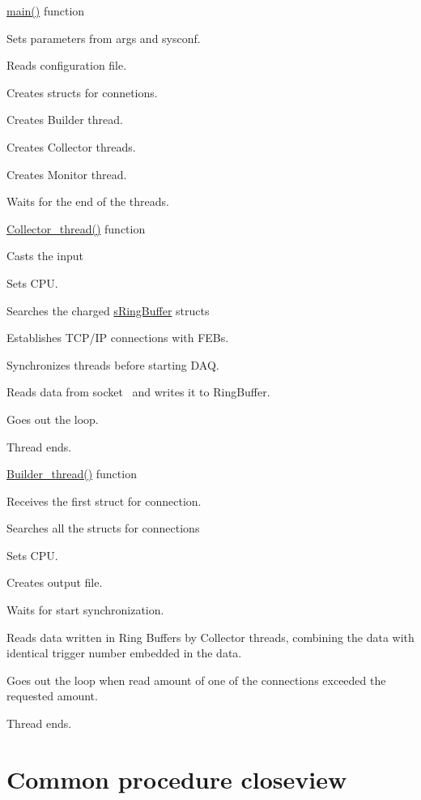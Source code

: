 \begin{DoxyItemize}
\item \hyperlink{Master_8cpp_a3c04138a5bfe5d72780bb7e82a18e627}{main()} function
\begin{DoxyItemize}
\item Sets parameters from args and sysconf.
\item Reads configuration file.
\item Creates structs for connetions.
\item Creates Builder thread.
\item Creates Collector threads.
\item Creates Monitor thread.
\item Waits for the end of the threads.
\end{DoxyItemize}
\item \hyperlink{Master_8cpp_a568c34b708bcc89579bda6142733110a}{Collector\+\_\+thread()} function
\begin{DoxyItemize}
\item Casts the input
\item Sets C\+PU.
\item Searches the charged \hyperlink{structsRingBuffer}{s\+Ring\+Buffer} structs
\item Establishes T\+C\+P/\+IP connections with F\+E\+Bs.
\item Synchronizes threads before starting D\+AQ.
\item Reads data from socket~\newline
 and writes it to Ring\+Buffer.
\item Goes out the loop.
\item Thread ends.
\end{DoxyItemize}
\item \hyperlink{Master_8cpp_a435b26afa480ba18cbef3620d0eccee2}{Builder\+\_\+thread()} function
\begin{DoxyItemize}
\item Receives the first struct for connection.
\item Searches all the structs for connections
\item Sets C\+PU.
\item Creates output file.
\item Waits for start synchronization.
\item Reads data written in Ring Buffers by Collector threads, combining the data with identical trigger number embedded in the data.
\item Goes out the loop when read amount of one of the connections exceeded the requested amount.
\item Thread ends.
\end{DoxyItemize}
\end{DoxyItemize}\hypertarget{index_PROCEDURE_CLOSEVIEW}{}\section{Common procedure closeview}\label{index_PROCEDURE_CLOSEVIEW}
